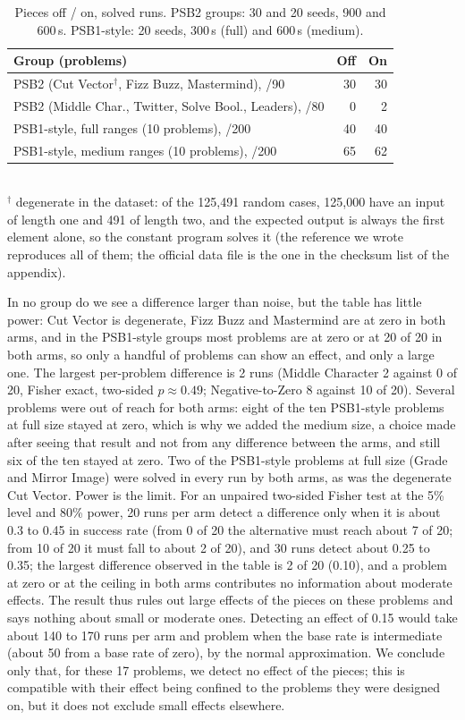 \documentclass[sigconf,nonacm]{acmart}
\begin{document}
\begin{table}[t]
  \caption{Pieces off / on, solved runs. PSB2 groups: 30 and 20 seeds, 900 and 600\,s. PSB1-style: 20 seeds, 300\,s (full) and 600\,s (medium).}
  \label{tab:transfer}
  \begin{tabular}{lrr}
    \toprule
    Group (problems) & Off & On \\
    \midrule
    PSB2 (Cut Vector$^\dagger$, Fizz Buzz, Mastermind), /90 & 30 & 30 \\
    PSB2 (Middle Char., Twitter, Solve Bool., Leaders), /80 & 0 & 2 \\
    PSB1-style, full ranges (10 problems), /200 & 40 & 40 \\
    PSB1-style, medium ranges (10 problems), /200 & 65 & 62 \\
    \bottomrule
  \end{tabular}\\[2pt]
  {\footnotesize $^\dagger$ degenerate in the dataset: of the 125,491 random cases, 125,000 have an input of length one and 491 of length two, and the expected output is always the first element alone, so the constant program solves it (the reference we wrote reproduces all of them; the official data file is the one in the checksum list of the appendix).}
\end{table}

In no group do we see a difference larger than noise, but the table has little power: Cut Vector is degenerate, Fizz Buzz and Mastermind are at zero in both arms, and in the PSB1-style groups most problems are at zero or at 20 of 20 in both arms, so only a handful of problems can show an effect, and only a large one. The largest per-problem difference is 2 runs (Middle Character 2 against 0 of 20, Fisher exact, two-sided $p \approx 0.49$;
Negative-to-Zero 8 against 10 of 20). Several problems were out of reach for both arms: eight of the ten PSB1-style problems at full
size stayed at zero, which is why we added the medium size, a choice made after seeing that result and not from any difference between the arms, and still six of the
ten stayed at zero. Two of the PSB1-style problems at full size (Grade and Mirror Image) were solved in every run by both arms,
as was the degenerate Cut Vector. Power is the limit. For an unpaired two-sided Fisher test at the 5\% level and 80\% power, 20 runs per arm detect a difference only when it is about 0.3 to 0.45 in success rate (from 0 of 20 the alternative must reach about 7 of 20; from 10 of 20 it must fall to about 2 of 20), and 30 runs detect about 0.25 to 0.35; the largest difference observed in the table is 2 of 20 (0.10), and a problem at zero or at the ceiling in both arms contributes no information about moderate effects. The result thus rules out large effects of the pieces on these problems and says nothing about small or moderate ones. Detecting an effect of 0.15 would take about 140 to 170 runs per arm and problem when the base rate is intermediate (about 50 from a base rate of zero), by the normal approximation.
We conclude only that, for these 17 problems, we detect no effect of the pieces; this is compatible with their effect being confined to the problems they were designed on, but it does not exclude small effects elsewhere.
\end{document}
